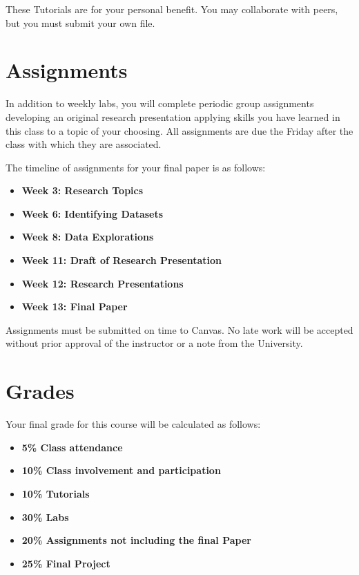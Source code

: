 These Tutorials are for your personal benefit. You may collaborate with peers, but you must submit your own file.

\section{Assignments} 

In addition to weekly labs, you will complete periodic group assignments developing an original research presentation applying skills you have learned in this class to a topic of your choosing. All assignments are due the Friday after the class with which they are associated. 

The timeline of assignments for your final paper is as follows:

\begin{itemize}
\item \textbf{Week 3: Research Topics}
\item \textbf{Week 6: Identifying Datasets}
\item \textbf{Week 8: Data Explorations}
\item \textbf{Week 11: Draft of Research Presentation}
\item \textbf{Week 12: Research Presentations}
\item \textbf{Week 13: Final Paper}
\end{itemize}

Assignments must be submitted on time to Canvas. No late work will be accepted without prior approval of the instructor or a note from the University.


\section{Grades}

Your final grade for this course will be calculated as follows:

\begin{itemize}
	\item \textbf{5\% Class attendance}
	\item \textbf{10\% Class involvement and participation}
	\item \textbf{10\% Tutorials}
	\item \textbf{30\% Labs}
	\item \textbf{20\% Assignments not including the final Paper}
	\item \textbf{25\% Final Project}
\end{itemize}



